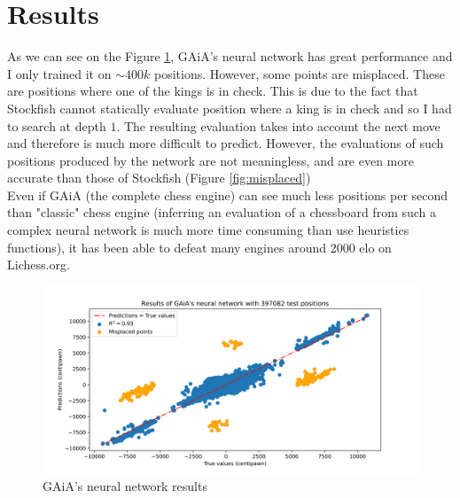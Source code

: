 \documentclass[a4paper]{article}
\begin{document}
\section{Results}
As we can see on the Figure \ref{fig:result}, GAiA's neural network
has great performance and I only trained it on $\sim 400k$ positions.
However, some points are misplaced. These are positions where one of the kings is
in check. This is due to the fact that Stockfish cannot statically evaluate
position where a king is in check and so I had to search at depth $1$.
The resulting evaluation takes into account the next move and therefore
is much more difficult to predict. However, the evaluations of
such positions produced by the network are not meaningless,
and are even more accurate than those of Stockfish (Figure \ref{fig:misplaced})\\
Even if GAiA (the complete chess engine) can see much less positions
per second than "classic" chess engine (inferring an evaluation of a chessboard
from such a complex neural network is much more time consuming than
use heuristics functions), it has been able to defeat many engines
around 2000 elo on Lichess.org.

\begin{figure}[H]
  \centering
  \includegraphics[width=13cm]{result.png}
  \caption{GAiA's neural network results}
  \label{fig:result}
\end{figure}
\end{document}
